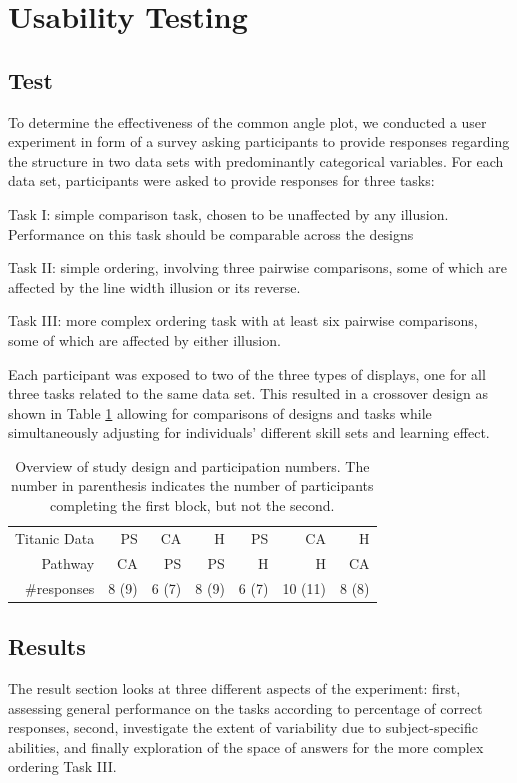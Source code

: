 \section{Usability Testing}
\subsection{Test}

To determine the effectiveness of the common angle plot, we conducted a user experiment in form of a survey asking participants to provide responses regarding the structure in two data sets with predominantly categorical variables.
For each data set, participants were asked to provide responses for three tasks:

Task I: simple comparison task, chosen to be unaffected by any illusion. Performance on this task should be comparable across the designs

Task II: simple ordering, involving three pairwise comparisons, some of which are affected by the line width illusion or its reverse. 

Task III: more complex ordering task with at least six pairwise comparisons, some of which are affected by either illusion.
  
Each participant was exposed to two of the three types of displays, one for all three tasks related to the same data set.
This resulted in a crossover design as shown in Table \ref{tab:designs} allowing for comparisons of designs and tasks while  simultaneously adjusting for individuals' different skill sets and learning effect.

\begin{table}[htbp]
\centering
\begin{tabular}{rrrrrrr}
Titanic Data & PS & CA & H & PS & CA & H \\ 
Pathway & CA & PS & PS & H& H & CA \\ \hline
\#responses &  8 (9) &  6 (7) &  8 (9) &  6 (7) & 10 (11) & 8 (8)\\ 
\end{tabular}
\caption{\label{tab:designs} Overview of study design and participation numbers. The number in parenthesis indicates the number of participants completing the first block, but not the second.}
\end{table}


\subsection{Results}
The result section looks at three different aspects of the experiment: first,  assessing general performance on the tasks according to percentage of correct responses, second, investigate the extent of variability due to subject-specific abilities, and finally exploration of the space of answers for the more complex ordering Task III.
